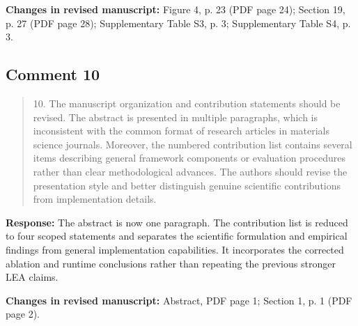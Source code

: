 \documentclass[11pt,a4paper]{article}
\begin{document}
\textbf{Changes in revised manuscript:} Figure 4, p. 23 (PDF page 24); Section 19, p. 27 (PDF page 28); Supplementary Table S3, p. 3; Supplementary Table S4, p. 3.

\subsection*{Comment 10}
\begin{quote}\small 10. The manuscript organization and contribution statements should be revised. The abstract is presented in multiple paragraphs, which is inconsistent with the common format of research articles in materials science journals. Moreover, the numbered contribution list contains several items describing general framework components or evaluation procedures rather than clear methodological advances. The authors should revise the presentation style and better distinguish genuine scientific contributions from implementation details.\end{quote}
\textbf{Response:} The abstract is now one paragraph. The contribution list is reduced to four scoped statements and separates the scientific formulation and empirical findings from general implementation capabilities. It incorporates the corrected ablation and runtime conclusions rather than repeating the previous stronger LEA claims.

\textbf{Changes in revised manuscript:} Abstract, PDF page 1; Section 1, p. 1 (PDF page 2).
\end{document}

